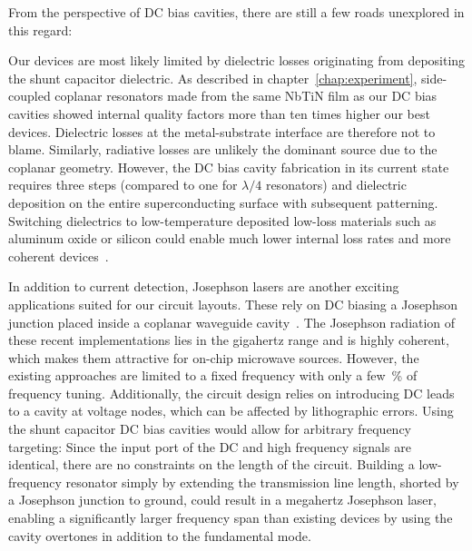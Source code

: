 
From the perspective of DC bias cavities, there are still a few roads unexplored in this regard:

Our devices are most likely limited by dielectric losses originating from depositing the shunt capacitor dielectric.
%
As described in chapter~\ref{chap:experiment}, side-coupled coplanar resonators made from the same NbTiN film as our DC bias cavities showed internal quality factors more than ten times higher our best devices.
%
Dielectric losses at the metal-substrate interface are therefore not to blame.
%
Similarly, radiative losses are unlikely the dominant source due to the coplanar geometry.
%
However, the DC bias cavity fabrication in its current state requires three steps (compared to one for $\lambda/4$ resonators) and dielectric deposition on the entire superconducting surface with subsequent patterning.
%
Switching dielectrics to low-temperature deposited low-loss materials such as aluminum oxide or silicon could enable much lower internal loss rates and more coherent devices~\cite{adamyanTunableSuperconductingMicrostrip2016}.

In addition to current detection, Josephson lasers are another exciting applications suited for our circuit layouts.
%
These rely on DC biasing a Josephson junction placed inside a coplanar waveguide cavity~\cite{chenRealizationSingleCooperpairJosephson2014c,cassidyDemonstrationAcJosephson2017e}.
%
The Josephson radiation of these recent implementations lies in the gigahertz range and is highly coherent, which makes them attractive for on-chip microwave sources.
%
However, the existing approaches are limited to a fixed frequency with only a few~\si{\percent} of frequency tuning.
%
Additionally, the circuit design relies on introducing DC leads to a cavity at voltage nodes, which can be affected by lithographic errors.
%
Using the shunt capacitor DC bias cavities would allow for arbitrary frequency targeting:
%
Since the input port of the DC and high frequency signals are identical, there are no constraints on the length of the circuit.
%
Building a low-frequency resonator simply by extending the transmission line length, shorted by a Josephson junction to ground, could result in a megahertz Josephson laser, enabling a significantly larger frequency span than existing devices by using the cavity overtones in addition to the fundamental mode.

